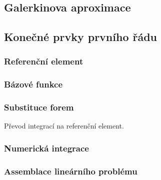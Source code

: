 \subsection{Galerkinova aproximace}

\subsection{Konečné prvky prvního řádu}
\subsubsection{Referenční element}
\subsubsection{Bázové funkce}
\subsubsection{Substituce forem}
Převod integrací na referenční element.
\subsubsection{Numerická integrace}
\subsubsection{Assemblace lineárního problému}
